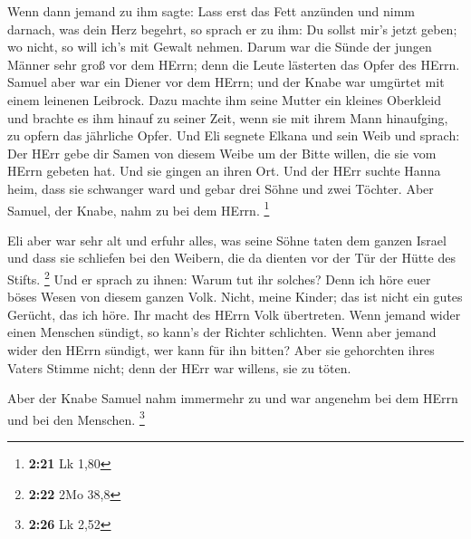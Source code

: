  Wenn dann jemand zu ihm sagte: Lass erst das Fett anzünden
und nimm darnach, was dein Herz begehrt, so sprach er zu ihm: Du sollst
mir's jetzt geben; wo nicht, so will ich's mit Gewalt nehmen.
 Darum war die Sünde der jungen Männer sehr groß vor dem
HErrn; denn die Leute lästerten das Opfer des HErrn. 
Samuel aber war ein Diener vor dem HErrn; und der Knabe war umgürtet mit
einem leinenen Leibrock.  Dazu machte ihm seine Mutter ein
kleines Oberkleid und brachte es ihm hinauf zu seiner Zeit, wenn sie mit
ihrem Mann hinaufging, zu opfern das jährliche Opfer.  Und
Eli segnete Elkana und sein Weib und sprach: Der HErr gebe dir Samen von
diesem Weibe um der Bitte willen, die sie vom HErrn gebeten hat. Und sie
gingen an ihren Ort.  Und der HErr suchte Hanna heim, dass
sie schwanger ward und gebar drei Söhne und zwei Töchter. Aber Samuel,
der Knabe, nahm zu bei dem HErrn. \footnote{\textbf{2:21} Lk 1,80}

 Eli aber war sehr alt und erfuhr alles, was seine Söhne
taten dem ganzen Israel und dass sie schliefen bei den Weibern, die da
dienten vor der Tür der Hütte des Stifts. \footnote{\textbf{2:22} 2Mo
  38,8}  Und er sprach zu ihnen: Warum tut ihr solches?
Denn ich höre euer böses Wesen von diesem ganzen Volk. 
Nicht, meine Kinder; das ist nicht ein gutes Gerücht, das ich höre. Ihr
macht des HErrn Volk übertreten.  Wenn jemand wider einen
Menschen sündigt, so kann's der Richter schlichten. Wenn aber jemand
wider den HErrn sündigt, wer kann für ihn bitten? Aber sie gehorchten
ihres Vaters Stimme nicht; denn der HErr war willens, sie zu töten.

 Aber der Knabe Samuel nahm immermehr zu und war angenehm
bei dem HErrn und bei den Menschen. \footnote{\textbf{2:26} Lk 2,52}

